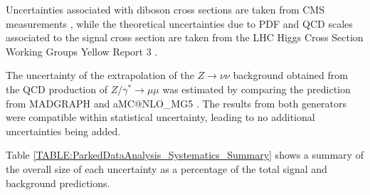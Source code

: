 Uncertainties associated with diboson cross sections are taken from \gls{CMS} measurements \cite{ARTICLE:CMSMeasurmentOfWWandZZxsec}, while the theoretical uncertainties due to \gls{PDF} and \gls{QCD} scales associated to the signal cross section are taken from the \gls{LHC} Higgs Cross Section Working Groups Yellow Report 3 \cite{ARTICLE:HandbookofLHCHiggsCrossSectionsInclusiveObservables,ARTICLE:HandbookofLHCHiggsCrossSectionsDifferentialDistributions}.

The uncertainty of the extrapolation of the  $Z\rightarrow\nu\nu$ background obtained from the \gls{QCD} production of $Z/\gamma^{*}\rightarrow\mu\mu$ was estimated by comparing the prediction from \textsc{MADGRAPH} and a\textsc{MC@NLO\_MG5} \cite{ARTICLE:aMCatNLO}. The results from both generators were compatible within statistical uncertainty, leading to no additional uncertainties being added. 

Table \ref{TABLE:ParkedDataAnalysis_Systematics_Summary} shows a summary of the overall size of each uncertainty as a percentage of the total signal and background predictions.

